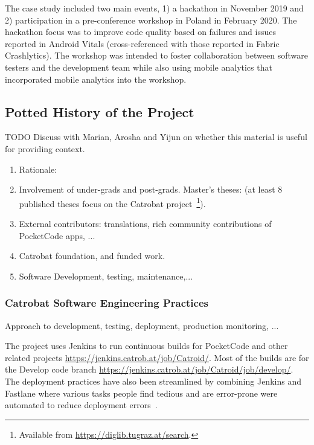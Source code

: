 The case study included two main events, 1) a hackathon in November 2019 and 2) participation in a pre-conference workshop in Poland in February 2020. 
The hackathon focus was to improve code quality based on failures and issues reported in Android Vitals (cross-referenced with those reported in Fabric Crashlytics). The workshop was intended to foster collaboration between software testers and the development team while also using mobile analytics that incorporated mobile analytics into the workshop.


\subsection{Potted History of the Project}
TODO Discuss with Marian, Arosha and Yijun on whether this material is useful for providing context.
\begin{enumerate}
    \item Rationale:
    \item Involvement of under-grads and post-grads. Master's theses: (at least 8 published theses focus on the Catrobat project~\footnote{Available from \url{https://diglib.tugraz.at/search}.}).
    \item External contributors: translations, rich community contributions of PocketCode apps, ...
    \item Catrobat foundation, and funded work.
    \item Software Development, testing, maintenance,...
\end{enumerate}

\subsubsection{Catrobat Software Engineering Practices}
Approach to development, testing, deployment, production monitoring, ...

The project uses Jenkins to run continuous builds for PocketCode and other related projects \url{https://jenkins.catrob.at/job/Catroid/}. Most of the builds are for the Develop code branch \url{https://jenkins.catrob.at/job/Catroid/job/develop/}. The deployment practices have also been streamlined by combining Jenkins and Fastlane where various tasks people find tedious and are error-prone were automated to reduce deployment errors~\citep{luhana2018streamlining}.

